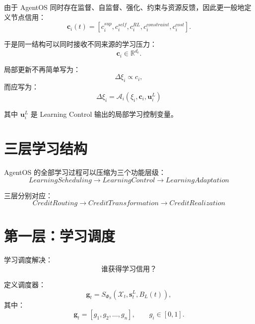 由于 AgentOS 同时存在监督、自监督、强化、约束与资源反馈，因此更一般地定义节点信用：
\begin{equation}
\mathbf{c}_i(t)
=
\left[
c_i^{sup},
c_i^{self},
c_i^{RL},
c_i^{constraint},
c_i^{cost}
\right].
\end{equation}

于是同一结构可以同时接收不同来源的学习压力：
\begin{equation}
\mathbf{c}_i
\in
\mathbb{R}^{d_c}.
\end{equation}

局部更新不再简单写为：
\begin{equation}
\Delta\xi_i
\propto
c_i,
\end{equation}
而应写为：
\begin{equation}
\boxed{
\Delta\xi_i
=
\mathcal{A}_i
(
\xi_i,
\mathbf{c}_i,
\mathbf{u}_i^L
)
}
\end{equation}

其中 $\mathbf{u}_i^L$ 是 Learning Control 输出的局部学习控制变量。


\section{三层学习结构}

AgentOS 的全部学习过程可以压缩为三个功能层级：
\begin{equation}
\boxed{
LearningScheduling
\rightarrow
LearningControl
\rightarrow
LearningAdaptation
}
\end{equation}

三层分别对应：
\begin{equation}
\boxed{
CreditRouting
\rightarrow
CreditTransformation
\rightarrow
CreditRealization
}
\end{equation}


\section{第一层：学习调度}

学习调度解决：
\begin{equation}
\boxed{
\text{谁获得学习信用？}
}
\end{equation}

定义调度器：
\begin{equation}
\mathbf{g}_t
=
S_{\Phi_S}
(
\mathcal{X}_t,
\mathbf{s}_t^L,
B_L(t)
),
\end{equation}
其中：
\begin{equation}
\mathbf{g}_t
=
[g_1,g_2,\ldots,g_n],
\qquad
g_i\in[0,1].
\end{equation}

